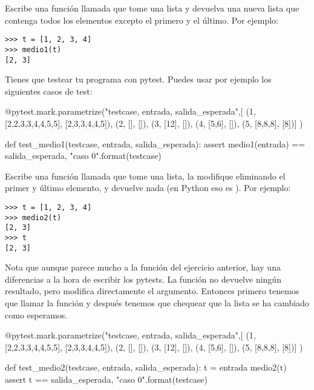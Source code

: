 \begin{exercise}

Escribe una función llamada  que tome una lista y
devuelva una nueva lista que contenga todos los elementos excepto el primero
y el último.  Por ejemplo:

\begin{Verbatim}[frame=single]
>>> t = [1, 2, 3, 4]
>>> medio1(t)
[2, 3]
\end{Verbatim}

Tienes que testear tu programa con pytest. Puedes usar por ejemplo los siguientes casos de test:

\begin{python}
@pytest.mark.parametrize("testcase, entrada, salida_esperada",[
(1, [2,2,3,3,4,4,5,5], [2,3,3,4,4,5]),   
(2, [], []),              
(3, [12], []),
(4, [5,6], []),
(5, [8,8,8], [8])]
)              

def test_medio1(testcase, entrada, salida_esperada):
    assert medio1(entrada) == salida_esperada, "caso {0}".format(testcase)
\end{python}

\end{exercise}

\begin{exercise}

Escribe una función llamada  que tome una lista, la modifique eliminando el primer y último elemento, y devuelve nada (en Python eso es ).
Por ejemplo:

\begin{Verbatim}[frame=single]
>>> t = [1, 2, 3, 4]
>>> medio2(t)
[2, 3]
>>> t
[2, 3]
\end{Verbatim}

Nota que aunque parece mucho a la función  del ejercicio anterior, hay una diferencias a la hora de escribir los pytests. La función no devuelve ningún resultado, pero modifica directamente el argumento. Entonces primero tenemos que llamar la función y después tenemos que chequear que la lista se ha cambiado como esperamos.


\begin{python}
@pytest.mark.parametrize("testcase, entrada, salida_esperada",[
(1, [2,2,3,3,4,4,5,5], [2,3,3,4,4,5]),   
(2, [], []),              
(3, [12], []),
(4, [5,6], []),
(5, [8,8,8], [8])]
)              

def test_medio2(testcase, entrada, salida_esperada):
    t = entrada
    medio2(t)
    assert t == salida_esperada, "caso {0}".format(testcase)
\end{python}

\end{exercise}



